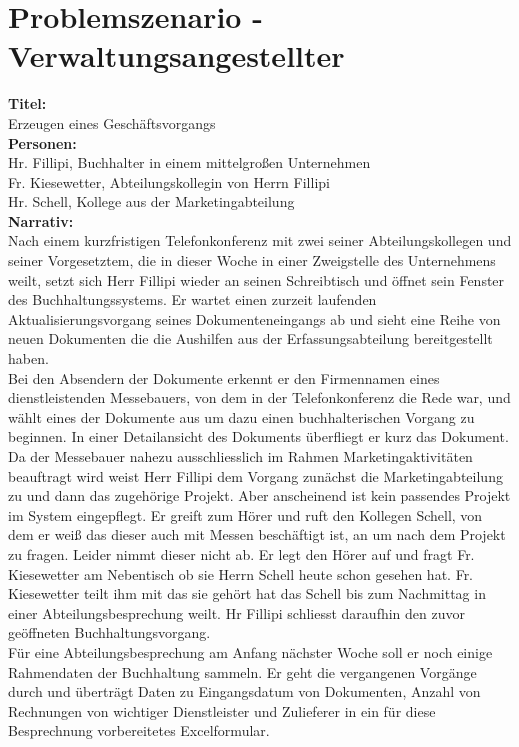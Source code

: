 \documentclass[11pt,oneside,a4paper,notitlepage]{article}
\begin{document}
%
\section{Problemszenario - Verwaltungsangestellter}


\textbf{Titel: }\\
Erzeugen eines Geschäftsvorgangs\\
\textbf{Personen: }\\
Hr. Fillipi, Buchhalter in einem mittelgroßen Unternehmen\\
Fr. Kiesewetter, Abteilungskollegin von Herrn Fillipi\\
Hr. Schell, Kollege aus der Marketingabteilung
\\[1cm]
\noindent
\textbf{Narrativ: }\\
Nach einem kurzfristigen Telefonkonferenz mit zwei seiner Abteilungskollegen und seiner Vorgesetztem, die in dieser Woche 
in einer Zweigstelle des Unternehmens weilt, setzt sich Herr Fillipi wieder an seinen Schreibtisch und öffnet sein Fenster des Buchhaltungssystems. Er wartet einen zurzeit laufenden Aktualisierungsvorgang seines Dokumenteneingangs ab und sieht eine Reihe von neuen Dokumenten die die Aushilfen aus der Erfassungsabteilung bereitgestellt haben. \\
Bei den Absendern der Dokumente erkennt er den Firmennamen eines dienstleistenden Messebauers, von dem in der Telefonkonferenz die Rede war, und wählt eines der Dokumente aus um dazu einen buchhalterischen Vorgang zu beginnen. In einer Detailansicht des Dokuments überfliegt er kurz das Dokument. Da der Messebauer nahezu ausschliesslich im Rahmen Marketingaktivitäten beauftragt wird weist Herr Fillipi dem Vorgang zunächst die Marketingabteilung zu und dann das zugehörige Projekt. Aber anscheinend ist kein passendes Projekt im System eingepflegt. Er greift zum Hörer und ruft den Kollegen Schell, von dem er weiß das dieser auch mit Messen beschäftigt ist, an um nach dem Projekt zu fragen. Leider nimmt dieser nicht ab. Er legt den Hörer auf und fragt Fr. Kiesewetter am Nebentisch ob sie Herrn Schell heute schon gesehen hat. Fr. Kiesewetter teilt ihm mit das sie gehört hat das Schell bis zum Nachmittag in einer Abteilungsbesprechung weilt. Hr Fillipi schliesst daraufhin den zuvor geöffneten Buchhaltungsvorgang.\\
Für eine Abteilungsbesprechung am Anfang nächster Woche soll er noch einige Rahmendaten der Buchhaltung sammeln. Er geht die vergangenen Vorgänge durch und überträgt Daten zu Eingangsdatum von Dokumenten, Anzahl von Rechnungen von wichtiger Dienstleister und Zulieferer in ein für diese Besprechnung vorbereitetes Excelformular.\\
\end{document}
